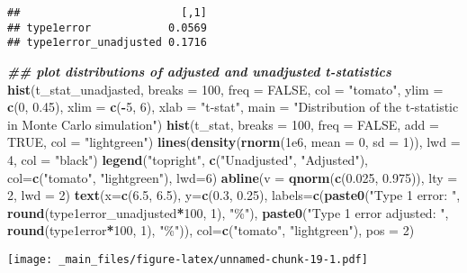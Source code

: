 \documentclass[
]{book}
\newenvironment{Shaded}{\begin{snugshade}}{\end{snugshade}}
\newcommand{\AttributeTok}[1]{\textcolor[rgb]{0.13,0.29,0.53}{#1}}
\newcommand{\ConstantTok}[1]{\textcolor[rgb]{0.56,0.35,0.01}{#1}}
\newcommand{\DecValTok}[1]{\textcolor[rgb]{0.00,0.00,0.81}{#1}}
\newcommand{\DocumentationTok}[1]{\textcolor[rgb]{0.56,0.35,0.01}{\textbf{\textit{#1}}}}
\newcommand{\FloatTok}[1]{\textcolor[rgb]{0.00,0.00,0.81}{#1}}
\newcommand{\FunctionTok}[1]{\textcolor[rgb]{0.13,0.29,0.53}{\textbf{#1}}}
\newcommand{\NormalTok}[1]{#1}
\newcommand{\SpecialCharTok}[1]{\textcolor[rgb]{0.81,0.36,0.00}{\textbf{#1}}}
\newcommand{\StringTok}[1]{\textcolor[rgb]{0.31,0.60,0.02}{#1}}
\begin{document}
\begin{verbatim}
##                         [,1]
## type1error            0.0569
## type1error_unadjusted 0.1716
\end{verbatim}

\begin{Shaded}
\begin{Highlighting}[]
\DocumentationTok{\#\# plot distributions of adjusted and unadjusted t{-}statistics}
\FunctionTok{hist}\NormalTok{(t\_stat\_unadjasted, }\AttributeTok{breaks =} \DecValTok{100}\NormalTok{, }\AttributeTok{freq =} \ConstantTok{FALSE}\NormalTok{, }\AttributeTok{col =} \StringTok{"tomato"}\NormalTok{, }
     \AttributeTok{ylim =} \FunctionTok{c}\NormalTok{(}\DecValTok{0}\NormalTok{, }\FloatTok{0.45}\NormalTok{), }\AttributeTok{xlim =} \FunctionTok{c}\NormalTok{(}\SpecialCharTok{{-}}\DecValTok{5}\NormalTok{, }\DecValTok{6}\NormalTok{), }\AttributeTok{xlab =} \StringTok{"t{-}stat"}\NormalTok{, }
     \AttributeTok{main =} \StringTok{"Distribution of the t{-}statistic in Monte Carlo simulation"}\NormalTok{)}
\FunctionTok{hist}\NormalTok{(t\_stat, }\AttributeTok{breaks =} \DecValTok{100}\NormalTok{, }\AttributeTok{freq =} \ConstantTok{FALSE}\NormalTok{, }\AttributeTok{add =} \ConstantTok{TRUE}\NormalTok{, }\AttributeTok{col =} \StringTok{"lightgreen"}\NormalTok{)}
\FunctionTok{lines}\NormalTok{(}\FunctionTok{density}\NormalTok{(}\FunctionTok{rnorm}\NormalTok{(}\FloatTok{1e6}\NormalTok{, }\AttributeTok{mean =} \DecValTok{0}\NormalTok{, }\AttributeTok{sd =} \DecValTok{1}\NormalTok{)), }\AttributeTok{lwd =} \DecValTok{4}\NormalTok{, }\AttributeTok{col =} \StringTok{"black"}\NormalTok{)}
\FunctionTok{legend}\NormalTok{(}\StringTok{"topright"}\NormalTok{, }\FunctionTok{c}\NormalTok{(}\StringTok{"Unadjusted"}\NormalTok{, }\StringTok{"Adjusted"}\NormalTok{), }\AttributeTok{col=}\FunctionTok{c}\NormalTok{(}\StringTok{"tomato"}\NormalTok{, }\StringTok{"lightgreen"}\NormalTok{), }\AttributeTok{lwd=}\DecValTok{6}\NormalTok{)}
\FunctionTok{abline}\NormalTok{(}\AttributeTok{v =} \FunctionTok{qnorm}\NormalTok{(}\FunctionTok{c}\NormalTok{(}\FloatTok{0.025}\NormalTok{, }\FloatTok{0.975}\NormalTok{)), }\AttributeTok{lty =} \DecValTok{2}\NormalTok{, }\AttributeTok{lwd =} \DecValTok{2}\NormalTok{)}
\FunctionTok{text}\NormalTok{(}\AttributeTok{x=}\FunctionTok{c}\NormalTok{(}\FloatTok{6.5}\NormalTok{, }\FloatTok{6.5}\NormalTok{), }\AttributeTok{y=}\FunctionTok{c}\NormalTok{(}\FloatTok{0.3}\NormalTok{, }\FloatTok{0.25}\NormalTok{), }
     \AttributeTok{labels=}\FunctionTok{c}\NormalTok{(}\FunctionTok{paste0}\NormalTok{(}\StringTok{"Type 1 error: "}\NormalTok{, }\FunctionTok{round}\NormalTok{(type1error\_unadjusted}\SpecialCharTok{*}\DecValTok{100}\NormalTok{, }\DecValTok{1}\NormalTok{), }\StringTok{"\%"}\NormalTok{),}
              \FunctionTok{paste0}\NormalTok{(}\StringTok{"Type 1 error adjusted: "}\NormalTok{, }\FunctionTok{round}\NormalTok{(type1error}\SpecialCharTok{*}\DecValTok{100}\NormalTok{, }\DecValTok{1}\NormalTok{), }\StringTok{"\%"}\NormalTok{)), }
     \AttributeTok{col=}\FunctionTok{c}\NormalTok{(}\StringTok{"tomato"}\NormalTok{, }\StringTok{"lightgreen"}\NormalTok{), }\AttributeTok{pos =} \DecValTok{2}\NormalTok{)}
\end{Highlighting}
\end{Shaded}

\texttt{[image: \_main\_files/figure-latex/unnamed-chunk-19-1.pdf]}

  
\end{document}
